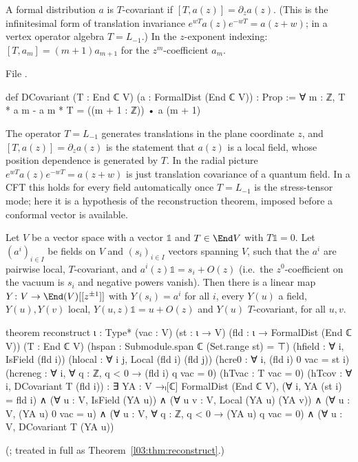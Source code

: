 \begin{definition}\label{ch03:def:DCovariant}
A formal distribution $a$ is $T$-covariant if $[T,a(z)]=\partial_za(z)$. (This is the
infinitesimal form of translation invariance $e^{wT}a(z)e^{-wT}=a(z+w)$; in a vertex operator
algebra $T=L_{-1}$.) In the $z$-exponent
indexing: $[T,a_m]=(m+1)a_{m+1}$ for the $z^m$-coefficient $a_m$.
\end{definition}
\noindent File .
\begin{leancode}
def DCovariant (T : End ℂ V) (a : FormalDist (End ℂ V)) : Prop :=
  ∀ m : ℤ, T * a m - a m * T = ((m + 1 : ℤ)) • a (m + 1)
\end{leancode}

\begin{physics}
The operator $T=L_{-1}$ generates translations in the plane coordinate $z$, and $[T,a(z)]=\partial_za(z)$ is the statement that $a(z)$ is a local field, whose position dependence is generated by $T$. In the radial picture $e^{wT}a(z)e^{-wT}=a(z+w)$ is just translation covariance of a quantum field. In a CFT this holds for every field automatically once $T=L_{-1}$ is the stress-tensor mode; here it is a hypothesis of the reconstruction theorem, imposed before a conformal vector is available.
\end{physics}

\begin{theorem}[Reconstruction]\label{ch03:thm:reconstruct}
Let $V$ be a vector space with a vector $\mathbb 1$ and $T\in\End V$ with $T\mathbb1=0$. Let
$(a^i)_{i\in I}$ be fields on $V$ and $(s_i)_{i\in I}$ vectors spanning $V$, such that the $a^i$
are pairwise local, $T$-covariant, and $a^i(z)\mathbb 1=s_i+O(z)$ (i.e.\ the $z^0$-coefficient on
the vacuum is $s_i$ and negative powers vanish). Then there is a linear map
$Y\colon V\to\End(V)[[z^{\pm1}]]$ with $Y(s_i)=a^i$ for all $i$, every $Y(u)$ a field,
$Y(u),Y(v)$ local, $Y(u,z)\mathbb1=u+O(z)$ and $Y(u)$ $T$-covariant, for all $u,v$.
\end{theorem}
\begin{leancode}
theorem reconstruct {ι : Type*} (vac : V) (st : ι → V) (fld : ι → FormalDist (End ℂ V))
    (T : End ℂ V)
    (hspan : Submodule.span ℂ (Set.range st) = ⊤)
    (hfield : ∀ i, IsField (fld i))
    (hlocal : ∀ i j, Local (fld i) (fld j))
    (hcre0 : ∀ i, (fld i) 0 vac = st i)
    (hcreneg : ∀ i, ∀ q : ℤ, q < 0 → (fld i) q vac = 0)
    (hTvac : T vac = 0)
    (hTcov : ∀ i, DCovariant T (fld i)) :
    ∃ YA : V →ₗ[ℂ] FormalDist (End ℂ V),
      (∀ i, YA (st i) = fld i) ∧
      (∀ u : V, IsField (YA u)) ∧
      (∀ u v : V, Local (YA u) (YA v)) ∧
      (∀ u : V, (YA u) 0 vac = u) ∧
      (∀ u : V, ∀ q : ℤ, q < 0 → (YA u) q vac = 0) ∧
      (∀ u : V, DCovariant T (YA u))
\end{leancode}
(; treated in full as Theorem~\ref{l03:thm:reconstruct}.)

